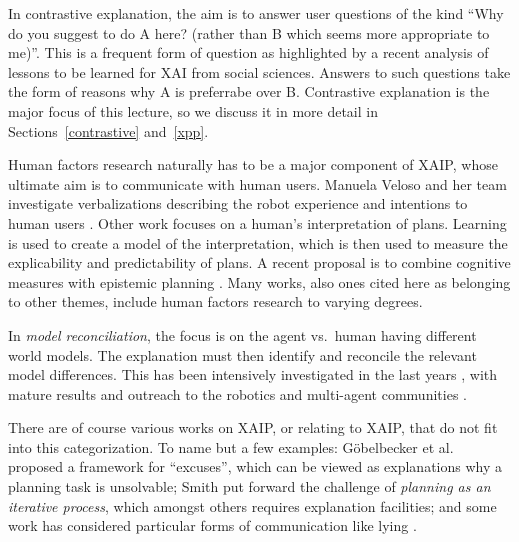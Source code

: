 In contrastive explanation, the aim is to answer user questions of the
kind ``Why do you suggest to do A here? (rather than B which seems
more appropriate to me)''. This is a frequent form of question as
highlighted by a recent analysis \cite{miller:ai-19} of lessons to be
learned for XAI from social sciences. Answers to such questions take
the form of reasons why A is preferrabe over B. Contrastive
explanation is the major focus of this lecture, so we discuss it in
more detail in Sections~\ref{contrastive} and~\ref{xpp}.

Human factors research naturally has to be a major component of XAIP,
whose ultimate aim is to communicate with human users. Manuela Veloso
and her team investigate verbalizations describing the robot
experience and intentions to human users
\cite{rosenthal:etal:ijcai-16}. Other work \cite{zhang:etal:icra-17}
focuses on a human's interpretation of plans. Learning is used to
create a model of the interpretation, which is then used to measure
the explicability and predictability of plans. A recent proposal is to
combine cognitive measures with epistemic planning
\cite{petrick:etal:xaip-19}. Many works, also ones cited here as
belonging to other themes, include human factors research to varying
degrees.

In \emph{model reconciliation}, the focus is on the agent vs.\ human
having different world models. The explanation must then identify and
reconcile the relevant model differences. This has been intensively
investigated in the last years
\cite{chakraborti:etal:ijcai-17,SreedharanCK18,KulkarniZCVZK19,sreedharan:etal:xaip-19},
with mature results and outreach to the robotics
\cite{chakraborti:etal:hri-19} and multi-agent communities
\cite{kambhampati:aamas-19}.

There are of course various works on XAIP, or relating to XAIP, that
do not fit into this categorization. To name but a few examples:
G{\"{o}}belbecker et al.\ \cite{goebelbecker:etal:icaps-10} proposed a
framework for ``excuses'', which can be viewed as explanations why a
planning task is unsolvable; Smith \cite{smith:aaai-12} put forward
the challenge of \emph{planning as an iterative process}, which
amongst others requires explanation facilities; and some work has
considered particular forms of communication like lying
\cite{chakraborti:kambhampati:xaip-19}.









